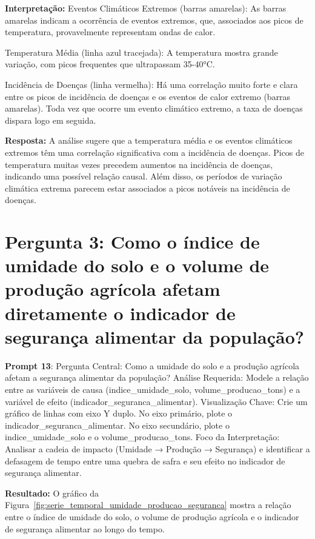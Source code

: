 \documentclass[12pt, a4paper, onecolumn]{article}
\begin{document}
    \textbf{Interpretação:}
    Eventos Climáticos Extremos (barras amarelas): As barras amarelas indicam a ocorrência de eventos extremos, que, associados aos picos de temperatura, provavelmente representam ondas de calor.

    Temperatura Média (linha azul tracejada): A temperatura mostra grande variação, com picos frequentes que ultrapassam 35-40°C.

    Incidência de Doenças (linha vermelha): Há uma correlação muito forte e clara entre os picos de incidência de doenças e os eventos de calor extremo (barras amarelas). Toda vez que ocorre um evento climático extremo, a taxa de doenças dispara logo em seguida.
    \vspace{0.5cm}

    \textbf{Resposta:} A análise sugere que a temperatura média e os eventos climáticos extremos têm uma correlação significativa com a incidência de doenças. Picos de temperatura muitas vezes precedem aumentos na incidência de doenças, indicando uma possível relação causal. Além disso, os períodos de variação climática extrema parecem estar associados a picos notáveis na incidência de doenças.

    \section*{Pergunta 3: Como o índice de umidade do solo e o volume de produção agrícola afetam diretamente o indicador de segurança alimentar da população?}

    \textbf{Prompt 13}: Pergunta Central: Como a umidade do solo e a produção agrícola afetam a segurança alimentar da população?
    Análise Requerida: Modele a relação entre as variáveis de causa (indice\_umidade\_solo, volume\_producao\_tons) e a variável de efeito (indicador\_seguranca\_alimentar).
    Visualização Chave: Crie um gráfico de linhas com eixo Y duplo. No eixo primário, plote o indicador\_seguranca\_alimentar. No eixo secundário, plote o indice\_umidade\_solo e o volume\_producao\_tons.
    Foco da Interpretação: Analisar a cadeia de impacto (Umidade → Produção → Segurança) e identificar a defasagem de tempo entre uma quebra de safra e seu efeito no indicador de segurança alimentar.
    \vspace{0.5cm}

    \textbf{Resultado:} O gráfico da Figura~\ref{fig:serie_temporal_umidade_producao_seguranca} mostra a relação entre o índice de umidade do solo, o volume de produção agrícola e o indicador de segurança alimentar ao longo do tempo.
    \vspace{0.5cm}
\end{document}

